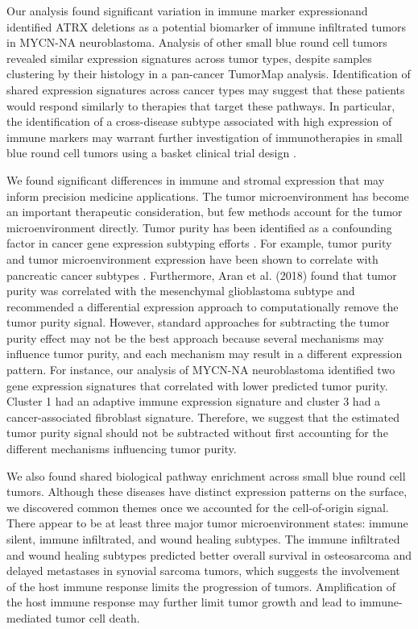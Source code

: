 \documentclass[10pt,letterpaper]{article}
\providecommand{\DIFaddtex}[1]{{\protect\color{blue}\uwave{#1}}} %
\providecommand{\DIFaddbegin}{} %
\providecommand{\DIFaddend}{} %
\providecommand{\DIFadd}[1]{\texorpdfstring{\DIFaddtex{#1}}{#1}} %
\newcommand{\DIFaddincludegraphics}[2][]{{\color{blue}\fbox{\DIFOincludegraphics[#1]{#2}}}} %
\DeclareRobustCommand{\DIFaddbegin}{\DIFOaddbegin \let\includegraphics\DIFaddincludegraphics} %
\DeclareRobustCommand{\DIFaddend}{\DIFOaddend \let\includegraphics\DIFOincludegraphics} %
\begin{document}
\DIFaddend Our analysis found significant variation in immune marker expression\DIFaddbegin \DIFadd{, including markers of response to checkpoint blockade therapy, }\DIFaddend and identified ATRX deletions as a potential biomarker of immune infiltrated tumors in MYCN-NA neuroblastoma. Analysis of other small blue round cell tumors revealed similar expression signatures across tumor types, despite samples clustering by their histology in a pan-cancer TumorMap analysis. Identification of shared expression signatures across cancer types may suggest that these patients would respond similarly to therapies that target these pathways. In particular, the identification of a cross-disease subtype associated with high expression of immune markers may warrant further investigation of immunotherapies in small blue round cell tumors using a basket clinical trial design \cite{cunananEfficientBasketTrial2017}.

We found significant differences in immune and stromal expression that may inform precision medicine applications. The tumor microenvironment has become an important therapeutic consideration, but few methods account for the tumor microenvironment directly. Tumor purity has been identified as a confounding factor in cancer gene expression subtyping efforts \cite{rheeImpactTumorPurity2018}. For example, tumor purity and tumor microenvironment expression have been shown to correlate with pancreatic cancer subtypes \cite{raphael2017integrated}. Furthermore, Aran et al. (2018) found that tumor purity was correlated with the mesenchymal glioblastoma subtype and recommended a differential expression approach to computationally remove the tumor purity signal. However, standard approaches for subtracting the tumor purity effect may not be the best approach because several mechanisms may influence tumor purity, and each mechanism may result in a different expression pattern. For instance, our analysis of MYCN-NA neuroblastoma identified two gene expression signatures that correlated with lower predicted tumor purity. Cluster 1 had an adaptive immune expression signature and cluster 3 had a cancer-associated fibroblast signature. Therefore, we suggest that the estimated tumor purity signal should not be subtracted without first accounting for the different mechanisms influencing tumor purity.

We also found shared biological pathway enrichment across small blue round cell tumors. Although these diseases have distinct expression patterns on the surface, we discovered common themes once we accounted for the cell-of-origin signal. There appear to be at least three major tumor microenvironment states: immune silent, immune infiltrated, and wound healing subtypes. The immune infiltrated and wound healing subtypes predicted better overall survival in osteosarcoma and delayed metastases in synovial sarcoma tumors, which suggests the involvement of the host immune response limits the progression of tumors. Amplification of the host immune response may further limit tumor growth and lead to immune-mediated tumor cell death. 
\end{document}
